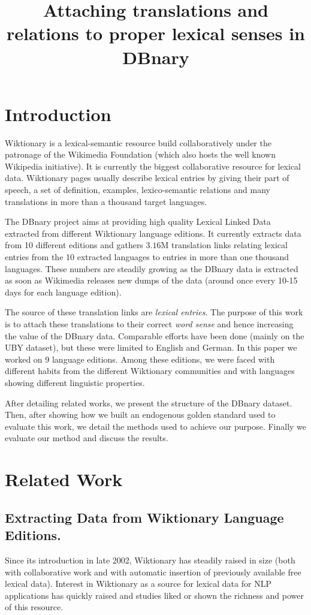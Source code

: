 \documentclass[10pt, a4paper]{article}
\title{Attaching translations and relations to proper lexical senses in DBnary}
\begin{document}
\maketitleabstract

\section{Introduction}

 Wiktionary is a lexical-semantic resource build collaboratively under the patronage of the Wikimedia Foundation (which also hosts the well known Wikipedia initiative). It is currently the biggest collaborative resource for lexical data. Wiktionary pages usually describe lexical entries by giving their part of speech, a set of definition, examples, lexico-semantic relations and many translations in more than a thousand target languages.

The DBnary project \cite{serasset:dbnary-swj} aims at providing high quality Lexical Linked Data extracted from different Wiktionary language editions. It currently extracts data from 10 different editions and gathers $3.16$M translation links relating lexical entries from the 10 extracted languages to entries in more than one thousand languages. These numbers are steadily growing as the DBnary data is extracted as soon as Wikimedia releases new dumps of the data (around once every 10-15 days for each language edition).

The source of these translation links are \emph{lexical entries}. The purpose of this work is to attach these translations to their correct \emph{word sense} and hence increasing the value of the DBnary data. Comparable efforts have been done (mainly on the UBY dataset), but these were limited to English and German. In this paper we worked on 9 language editions. Among these editions, we were faced with different habits from the different Wiktionary communities and with languages showing different linguistic properties. 

After detailing related works, we present the structure of the DBnary dataset. Then, after showing how we built an endogenous golden standard used to evaluate this work, we detail the methods used to achieve our purpose. Finally we evaluate our method and discuss the results.

\section{Related Work}

\subsection{Extracting Data from Wiktionary Language Editions.} Since its introduction in late 2002, Wiktionary has steadily raised in size (both with collaborative work and with automatic insertion of previously available free lexical data). Interest in Wiktionary as a source for lexical data for NLP applications has quickly raised and studies liked \cite{Zesch:AAAI2008} or \cite{navarro-EtAl:2009:PeoplesWeb} shown the richness and power of this resource. 
\end{document}
